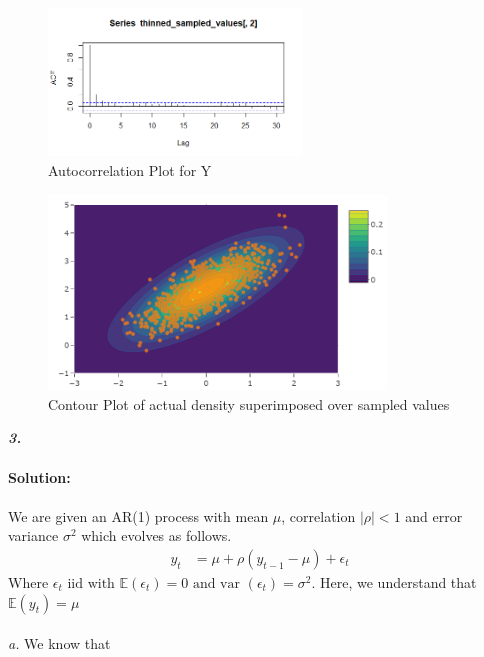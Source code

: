 \documentclass[11pt]{article}
\begin{document}
\begin{figure}[H]
  \centering
  \includegraphics[width = 0.6\textwidth]{ACF-2.png}
  \caption{Autocorrelation Plot for Y}
\end{figure}
\begin{figure}[H]
  \centering
  \includegraphics[width = 0.8\textwidth]{ContourPlot-2.png}
  \caption{Contour Plot of actual density superimposed over sampled values}
\end{figure}
\pagebreak
\noindent \textbf{\emph{3.}}\\ \\
\textbf{Solution:}\\ \\
We are given an AR(1) process with mean $\mu$, correlation $|\rho| < 1$ and error variance $\sigma^2$ which evolves as follows.
\begin{equation}
  \nonumber
  \begin{aligned}
    y_{t} & = \mu + \rho(y_{t-1} -\mu) + \epsilon_{t}
  \end{aligned}
\end{equation}
Where $\epsilon_{t} \text{ iid  with } \mathbb{E}(\epsilon_t) = 0 \text{ and var }(\epsilon_t) = \sigma^2$. Here, we understand that $\mathbb{E}(y_{t}) = \mu$ \\ \\
\emph{a.} We know that
\end{document}
